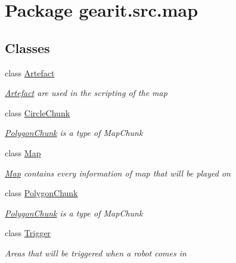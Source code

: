\hypertarget{namespacegearit_1_1src_1_1map}{\section{Package gearit.\+src.\+map}
\label{namespacegearit_1_1src_1_1map}
}
\subsection*{Classes}
\begin{DoxyCompactItemize}
\item 
class \hyperlink{classgearit_1_1src_1_1map_1_1_artefact}{Artefact}
\begin{DoxyCompactList}\small\item\em \hyperlink{classgearit_1_1src_1_1map_1_1_artefact}{Artefact} are used in the scripting of the map \end{DoxyCompactList}\item 
class \hyperlink{classgearit_1_1src_1_1map_1_1_circle_chunk}{Circle\+Chunk}
\begin{DoxyCompactList}\small\item\em \hyperlink{classgearit_1_1src_1_1map_1_1_polygon_chunk}{Polygon\+Chunk} is a type of Map\+Chunk \end{DoxyCompactList}\item 
class \hyperlink{classgearit_1_1src_1_1map_1_1_map}{Map}
\begin{DoxyCompactList}\small\item\em \hyperlink{classgearit_1_1src_1_1map_1_1_map}{Map} contains every information of map that will be played on \end{DoxyCompactList}\item 
class \hyperlink{classgearit_1_1src_1_1map_1_1_polygon_chunk}{Polygon\+Chunk}
\begin{DoxyCompactList}\small\item\em \hyperlink{classgearit_1_1src_1_1map_1_1_polygon_chunk}{Polygon\+Chunk} is a type of Map\+Chunk \end{DoxyCompactList}\item 
class \hyperlink{classgearit_1_1src_1_1map_1_1_trigger}{Trigger}
\begin{DoxyCompactList}\small\item\em Areas that will be triggered when a robot comes in \end{DoxyCompactList}\end{DoxyCompactItemize}
